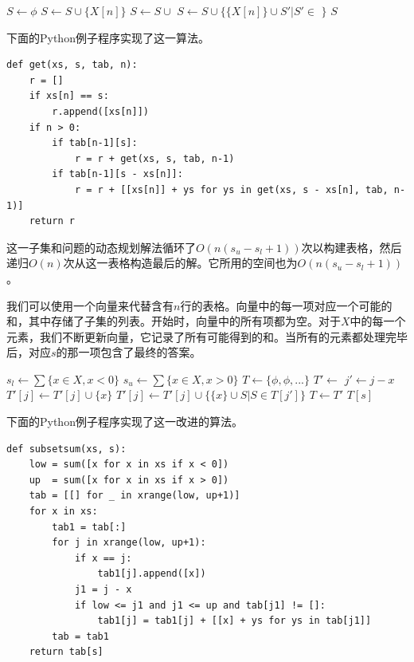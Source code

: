 \documentclass[b5paper]{ctexart}
\begin{document}
\begin{algorithmic}[1]
  \State $S \gets \phi$
    \State $S \gets S \cup \{X[n]\}$
  \EndIf
      \State $S \gets S \cup $ 
    \EndIf
      \State $S \gets S \cup \{\{X[n]\} \cup S' | S' \in $  $\}$
    \EndIf
  \EndIf
  \State \Return $S$
\EndFunction
\end{algorithmic}

下面的Python例子程序实现了这一算法。

\lstset{language=Python}
\begin{lstlisting}
def get(xs, s, tab, n):
    r = []
    if xs[n] == s:
        r.append([xs[n]])
    if n > 0:
        if tab[n-1][s]:
            r = r + get(xs, s, tab, n-1)
        if tab[n-1][s - xs[n]]:
            r = r + [[xs[n]] + ys for ys in get(xs, s - xs[n], tab, n-1)]
    return r
\end{lstlisting}

这一子集和问题的动态规划解法循环了$O(n(s_u - s_l + 1))$次以构建表格，然后递归$O(n)$次从这一表格构造最后的解。它所用的空间也为$O(n(s_u - s_l + 1))$。

我们可以使用一个向量来代替含有$n$行的表格。向量中的每一项对应一个可能的和，其中存储了子集的列表。开始时，向量中的所有项都为空。对于$X$中的每一个元素，我们不断更新向量，它记录了所有可能得到的和。当所有的元素都处理完毕后，对应$s$的那一项包含了最终的答案。

\begin{algorithmic}[1]
  \State $s_l \gets \sum \{x \in X, x < 0\}$
  \State $s_u \gets \sum \{x \in X, x > 0\}$
  \State $T \gets \{\phi, \phi, ...\}$ 
    \State $T' \gets$ 
      \State $j' \gets j - x$
        \State $T'[j] \gets T'[j] \cup \{x\}$
      \EndIf
        \State $T'[j] \gets T'[j] \cup \{\{x\} \cup S | S \in T[j']\}$
      \EndIf
    \EndFor
    \State $T \gets T'$
  \EndFor
  \State \Return $T[s]$
\EndFunction
\end{algorithmic}

下面的Python例子程序实现了这一改进的算法。

\lstset{language=Python}
\begin{lstlisting}
def subsetsum(xs, s):
    low = sum([x for x in xs if x < 0])
    up  = sum([x for x in xs if x > 0])
    tab = [[] for _ in xrange(low, up+1)]
    for x in xs:
        tab1 = tab[:]
        for j in xrange(low, up+1):
            if x == j:
                tab1[j].append([x])
            j1 = j - x
            if low <= j1 and j1 <= up and tab[j1] != []:
                tab1[j] = tab1[j] + [[x] + ys for ys in tab[j1]]
        tab = tab1
    return tab[s]
\end{lstlisting}
\end{document}

